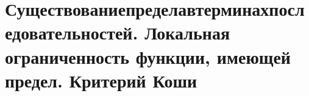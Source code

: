 \section{Существованиепределавтерминахпоследовательностей. Локальная ограниченность функции, имеющей предел. Критерий Коши}